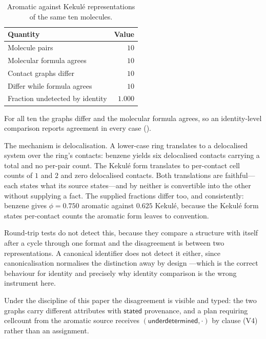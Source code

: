\documentclass[11pt,twocolumn,a4paper]{article}
\theoremstyle{msthm}
\theoremstyle{definition}
\theoremstyle{remark}
\newcommand{\stated}{\textsf{stated}}
\begin{document}
\begin{table}[htbp]
\centering\small
\caption{Aromatic against Kekul\'e representations of the same ten
molecules.}
\label{tab:disagree}
\begin{tabular}{@{}lr@{}}
\toprule
Quantity & Value\\
\midrule
Molecule pairs & $10$\\
Molecular formula agrees & $10$\\
Contact graphs differ & $10$\\
Differ while formula agrees & $10$\\
Fraction undetected by identity & $1.000$\\
\bottomrule
\end{tabular}
\end{table}

For all ten the graphs differ and the molecular formula agrees, so an
identity-level comparison reports agreement in every case
().

The mechanism is delocalisation. A lower-case ring translates to a
delocalised system over the ring's contacts: benzene yields six
delocalised contacts carrying a total and no per-pair count. The
Kekul\'e form translates to per-contact cell counts of $1$ and $2$ and
zero delocalised contacts. Both translations are faithful---each states
what its source states---and by  neither is convertible
into the other without supplying a fact. The supplied fractions differ
too, and consistently: benzene gives $\phi=0.750$ aromatic against
$0.625$ Kekul\'e, because the Kekul\'e form states per-contact counts
the aromatic form leaves to convention.

Round-trip tests do not detect this, because they compare a structure
with itself after a cycle through one format and the disagreement is
between two representations. A canonical identifier does not detect it
either, since canonicalisation normalises the distinction away by design
\citep{heller2015inchi}---which is the correct behaviour for identity
and precisely why identity comparison is the wrong instrument here.

Under the discipline of this paper the disagreement is visible and
typed: the two graphs carry different attributes with $\stated$
provenance, and a plan requiring \textsf{cellcount} from the aromatic
source receives $(\textsf{underdetermined},\cdot)$ by clause (V4) rather
than an assignment.
\end{document}
